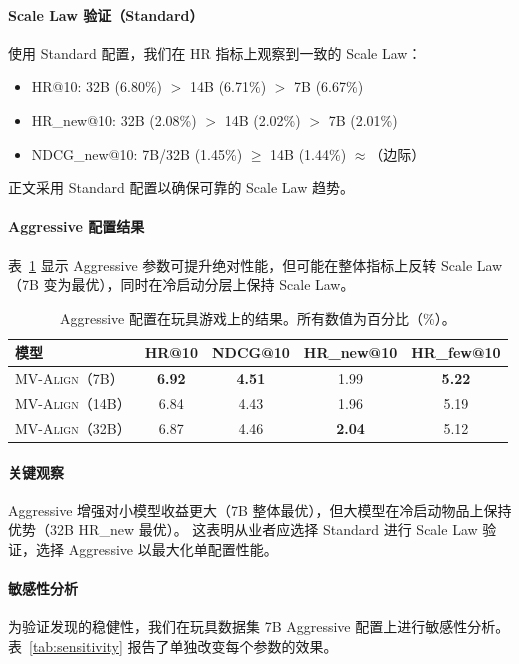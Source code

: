 \documentclass[sigconf,natbib=true]{acmart}
\newcommand{\model}{\textsc{MV-Align}\xspace}
\begin{document}
\paragraph{Scale Law 验证（Standard）}
使用 Standard 配置，我们在 HR 指标上观察到一致的 Scale Law：
\begin{itemize}[leftmargin=*,itemsep=1pt]
  \item HR@10: 32B (6.80\%) $>$ 14B (6.71\%) $>$ 7B (6.67\%) \checkmark
  \item HR\_new@10: 32B (2.08\%) $>$ 14B (2.02\%) $>$ 7B (2.01\%) \checkmark
  \item NDCG\_new@10: 7B/32B (1.45\%) $\geq$ 14B (1.44\%) $\approx$（边际）
\end{itemize}
正文采用 Standard 配置以确保可靠的 Scale Law 趋势。

\paragraph{Aggressive 配置结果}
表~\ref{tab:aggressive} 显示 Aggressive 参数可提升绝对性能，但可能在整体指标上反转 Scale Law（7B 变为最优），同时在冷启动分层上保持 Scale Law。

\begin{table}[t]
\caption{Aggressive 配置在玩具游戏上的结果。所有数值为百分比（\%）。}
\label{tab:aggressive}
\centering
\small
\begin{tabular}{lcccc}
\toprule
\textbf{模型} & HR@10 & NDCG@10 & HR\_new@10 & HR\_few@10 \\
\midrule
\model（7B） & \textbf{6.92} & \textbf{4.51} & 1.99 & \textbf{5.22} \\
\model（14B） & 6.84 & 4.43 & 1.96 & 5.19 \\
\model（32B） & 6.87 & 4.46 & \textbf{2.04} & 5.12 \\
\bottomrule
\end{tabular}
\end{table}

\paragraph{关键观察}
Aggressive 增强对小模型收益更大（7B 整体最优），但大模型在冷启动物品上保持优势（32B HR\_new 最优）。
这表明从业者应选择 Standard 进行 Scale Law 验证，选择 Aggressive 以最大化单配置性能。

\paragraph{敏感性分析}
为验证发现的稳健性，我们在玩具数据集 7B Aggressive 配置上进行敏感性分析。
表~\ref{tab:sensitivity} 报告了单独改变每个参数的效果。
\end{document}
